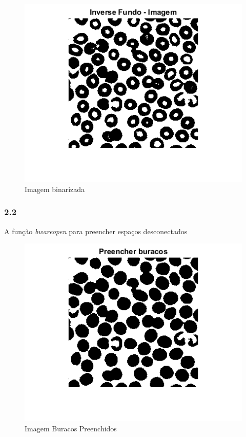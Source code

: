 \documentclass[journal]{IEEEtran}
\begin{document}
\begin{figure}[!htb]
	\centering
	\includegraphics[scale=0.5]{2-1.png}
	\caption{Imagem binarizada}
	\label{Original}
\end{figure}

\subsubsection*{2.2}
A função \textit{bwareopen} para preencher espaços desconectados\newline
\\ 

\begin{figure}[!htb]
	\centering
	\includegraphics[scale=0.5]{2-buracos.png}
	\caption{Imagem Buracos Preenchidos}
	\label{Original}
\end{figure}
\end{document}
